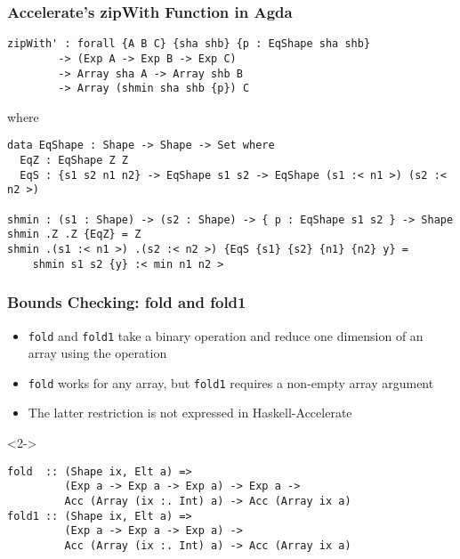 \documentclass{beamer}
\begin{document}
\begin{frame}[fragile]
  \frametitle{Accelerate's zipWith Function in Agda}
\begin{verbatim}
zipWith' : forall {A B C} {sha shb} {p : EqShape sha shb}
        -> (Exp A -> Exp B -> Exp C)
        -> Array sha A -> Array shb B
        -> Array (shmin sha shb {p}) C
\end{verbatim}
where\scriptsize
\begin{verbatim}
data EqShape : Shape -> Shape -> Set where
  EqZ : EqShape Z Z
  EqS : {s1 s2 n1 n2} -> EqShape s1 s2 -> EqShape (s1 :< n1 >) (s2 :< n2 >)

shmin : (s1 : Shape) -> (s2 : Shape) -> { p : EqShape s1 s2 } -> Shape
shmin .Z .Z {EqZ} = Z
shmin .(s1 :< n1 >) .(s2 :< n2 >) {EqS {s1} {s2} {n1} {n2} y} =
    shmin s1 s2 {y} :< min n1 n2 >
\end{verbatim}
\end{frame}

\begin{frame}[fragile]
  \frametitle{Bounds Checking: fold and fold1}

  \begin{itemize}
  \item \texttt{fold} and \texttt{fold1} take a binary operation and
    reduce one dimension of an array using the operation
  \item \texttt{fold} works for any array, but \texttt{fold1} requires
    a non-empty array argument
  \item The latter restriction is not expressed in Haskell-Accelerate
  \end{itemize}
  \begin{block}<2->{\vspace{-\baselineskip}}\small
\begin{verbatim}
fold  :: (Shape ix, Elt a) =>
         (Exp a -> Exp a -> Exp a) -> Exp a ->
         Acc (Array (ix :. Int) a) -> Acc (Array ix a)
fold1 :: (Shape ix, Elt a) =>
         (Exp a -> Exp a -> Exp a) ->
         Acc (Array (ix :. Int) a) -> Acc (Array ix a)
\end{verbatim}
  \end{block}
\end{frame}
\end{document}
